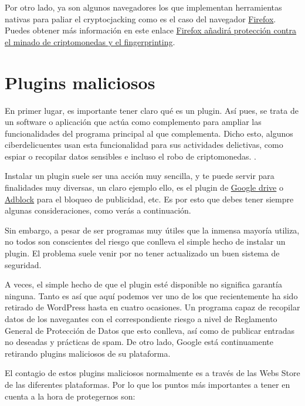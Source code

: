 \documentclass[
  a4paper,
  openany]{book}
\begin{document}
Por otro lado, ya son algunos navegadores los que implementan herramientas nativas para paliar el cryptocjacking como es el caso del navegador \href{https://www.mozilla.org/es-ES/firefox/browsers/}{Firefox}. Puedes obtener más información en este enlace \href{https://www.genbeta.com/navegadores/firefox-anadira-proteccion-minado-criptomonedas-fingerprinting}{Firefox añadirá protección contra el minado de criptomonedas y el fingerprinting}.

\hypertarget{plugins-maliciosos}{%
\section{Plugins maliciosos}\label{plugins-maliciosos}}

En primer lugar, es importante tener claro qué es un plugin. Así pues, se trata de un software o aplicación que actúa como complemento para ampliar las funcionalidades del programa principal al que complementa. Dicho esto, algunos ciberdelicuentes usan esta funcionalidad para sus actividades delictivas, como espiar o recopilar datos sensibles e incluso el robo de criptomonedas. \citep{IONOS-plugin}.

Instalar un plugin suele ser una acción muy sencilla, y te puede servir para finalidades muy diversas, un claro ejemplo ello, es el plugin de \href{https://drive.googleblog.com/2012/12/introducing-save-to-drive-extension.html}{Google drive} o \href{https://getadblock.com/}{Adblock} para el bloqueo de publicidad, etc. Es por esto que debes tener siempre algunas consideraciones, como verás a continuación.

Sin embargo, a pesar de ser programas muy útiles que la inmensa mayoría utiliza, no todos son conscientes del riesgo que conlleva el simple hecho de instalar un plugin. El problema suele venir por no tener actualizado un buen sistema de seguridad.

A veces, el simple hecho de que el plugin esté disponible no significa garantía ninguna. Tanto es así que aquí podemos ver uno de los que recientemente ha sido retirado de WordPress hasta en cuatro ocasiones. Un programa capaz de recopilar datos de los navegantes con el correspondiente riesgo a nivel de Reglamento General de Protección de Datos que esto conlleva, así como de publicar entradas no deseadas y prácticas de spam. De otro lado, Google está continuamente retirando plugins maliciosos de su plataforma.

El contagio de estos plugins maliciosos normalmente es a través de las Webs Store de las diferentes plataformas. Por lo que los puntos más importantes a tener en cuenta a la hora de protegernos son:
\end{document}
